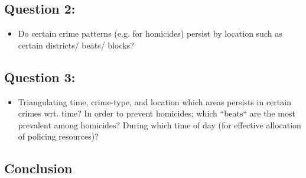 \documentclass[a4paper]{article}
\begin{document}
\subsection{Question 2:}


\begin{itemize}
  \item Do certain crime patterns (e.g. for homicides) persist by location such as certain districts/ beats/ blocks?
\end{itemize}


\subsection{Question 3:}



\begin{itemize}
  \item Triangulating time, crime-type, and location which areas persists in certain crimes wrt. time?
In order to prevent homicides; which “beats“ are the most prevalent among homicides? During which time of day (for effective allocation of policing resources)? 
\end{itemize}








\subsection{Conclusion}
\end{document}
